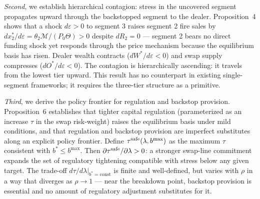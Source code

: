\textit{Second}, we establish hierarchical contagion: stress in the uncovered segment propagates
upward through the backstopped segment to the dealer. Proposition~4 shows that a shock
$d\varepsilon > 0$ to segment 3 raises segment 2 fire sales by
$dx_2^*/d\varepsilon = \theta_2\mathcal{M}/(P_0\Theta) > 0$
despite $dR_2 = 0$ — segment 2 bears no direct funding shock yet responds through the price
mechanism because the equilibrium basis has risen. Dealer wealth contracts
($dW^*/d\varepsilon < 0$) and swap supply compresses ($dO^*/d\varepsilon < 0$). The contagion is
hierarchically ascending: it travels from the lowest tier upward. This result has no counterpart
in existing single-segment frameworks; it requires the three-tier structure as a primitive.

\textit{Third}, we derive the policy frontier for regulation and backstop provision. Proposition~6
establishes that tighter capital regulation (parameterized as an increase $\tau$ in the swap
risk-weight) raises the equilibrium basis under mild conditions, and that regulation and backstop
provision are imperfect substitutes along an explicit policy frontier. Define $\tau^{\rm safe}(\lambda, b^{\max})$
as the maximum $\tau$ consistent with $b^* \leq b^{\max}$. Then $\partial\tau^{\rm safe}/\partial\lambda > 0$:
a stronger swap-line commitment expands the set of regulatory tightening compatible with stress
below any given target. The trade-off $d\tau/d\lambda|_{b^*=\text{const}}$ is finite and well-defined,
but varies with $\rho$ in a way that diverges as $\rho \to 1$ — near the breakdown point, backstop
provision is essential and no amount of regulatory adjustment substitutes for it.

